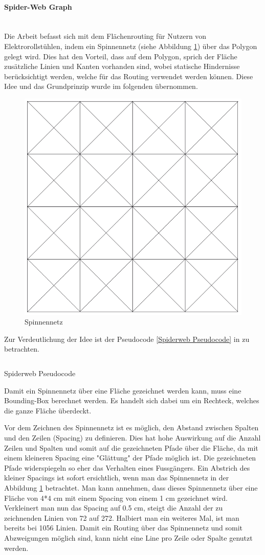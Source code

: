 \paragraph{Spider-Web Graph}\label{solution:Spider-Web Graph}~\\


Die Arbeit \cite{dzafic_spider_web_graph} befasst sich mit dem Flächenrouting für Nutzern von Elektrorollstühlen, indem ein Spinnennetz (siehe Abbildung \ref{fig:spiderweb}) über das Polygon gelegt wird. Dies hat den Vorteil, dass auf dem Polygon, sprich der Fläche zusätzliche Linien und Kanten vorhanden sind, wobei statische Hindernisse berücksichtigt werden, welche für das Routing verwendet werden können. Diese Idee und das Grundprinzip wurde im folgenden übernommen.

\begin{figure}[ht]
\centering
\includegraphics[width=0.5\linewidth]{technicalreport/img/spiderweb}
\caption[Spinnennetz]{Spinnennetz}
\label{fig:spiderweb}
\end{figure}

Zur Verdeutlichung der Idee ist der Pseudocode \ref{Spiderweb Pseudocode} in zu betrachten.

\begin{listing}[ht]
    \inputminted{python}{technicalreport/listing/spiderweb_pseudocode.py}
    \caption{Spiderweb Pseudocode}
    \label{Spiderweb Pseudocode}
\end{listing}

Damit ein Spinnennetz über eine Fläche gezeichnet werden kann, muss eine Bounding-Box berechnet werden. Es handelt sich dabei um ein Rechteck, welches die ganze Fläche überdeckt. 

Vor dem Zeichnen des Spinnennetz ist es möglich, den Abstand zwischen Spalten und den Zeilen (Spacing) zu definieren. Dies hat hohe Auswirkung auf die Anzahl Zeilen und Spalten und somit auf die gezeichneten Pfade über die Fläche, da mit einem kleineren Spacing eine "Glättung" der Pfade möglich ist. Die gezeichneten Pfade widerspiegeln so eher das Verhalten eines Fussgängers. Ein Abstrich des kleiner Spacings ist sofort ersichtlich, wenn man das Spinnennetz in der Abbildung \ref{fig:spiderweb} betrachtet. Man kann annehmen, dass dieses Spinnennetz über eine Fläche von 4*4 cm mit einem Spacing von einem 1 cm gezeichnet wird. Verkleinert man nun das Spacing auf 0.5 cm, steigt die Anzahl der zu zeichnenden Linien von 72 auf 272. Halbiert man ein weiteres Mal, ist man bereits bei 1056 Linien. Damit ein Routing über das Spinnennetz und somit Abzweigungen möglich sind, kann nicht eine Line pro Zeile oder Spalte genutzt werden.

